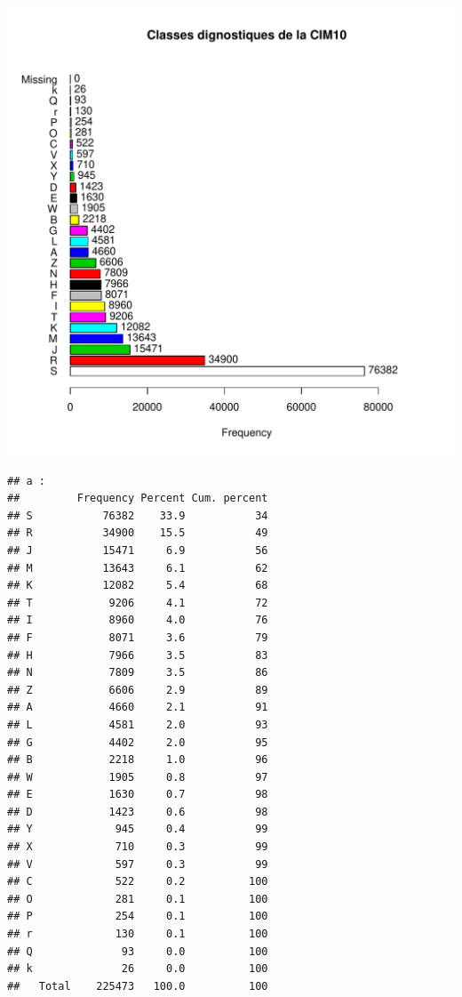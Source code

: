 \documentclass[12pt,english,french,twoside]{book}\usepackage[]{graphicx}\usepackage[]{color}
\makeatletter
\def\maxwidth{ %
  \ifdim\Gin@nat@width>\linewidth
    \linewidth
  \else
    \Gin@nat@width
  \fi
}
\newenvironment{kframe}{%
 \def\at@end@of@kframe{}%
 \ifinner\ifhmode%
  \def\at@end@of@kframe{\end{minipage}}%
  \begin{minipage}{\columnwidth}%
 \fi\fi%
 \def\FrameCommand##1{\hskip\@totalleftmargin \hskip-\fboxsep
 \colorbox{shadecolor}{##1}\hskip-\fboxsep
     \hskip-\linewidth \hskip-\@totalleftmargin \hskip\columnwidth}%
 \MakeFramed {\advance\hsize-\width
   \@totalleftmargin\z@ \linewidth\hsize
   \@setminipage}}%
 {\par\unskip\endMakeFramed%
 \at@end@of@kframe}
\newenvironment{knitrout}{}{} %
\makeatother
\begin{document}
\begin{knitrout}
\color{fgcolor}
\includegraphics[width=\maxwidth]{figure/class_cim10} 
\begin{kframe}\begin{verbatim}
## a :  
##         Frequency Percent Cum. percent
## S           76382    33.9           34
## R           34900    15.5           49
## J           15471     6.9           56
## M           13643     6.1           62
## K           12082     5.4           68
## T            9206     4.1           72
## I            8960     4.0           76
## F            8071     3.6           79
## H            7966     3.5           83
## N            7809     3.5           86
## Z            6606     2.9           89
## A            4660     2.1           91
## L            4581     2.0           93
## G            4402     2.0           95
## B            2218     1.0           96
## W            1905     0.8           97
## E            1630     0.7           98
## D            1423     0.6           98
## Y             945     0.4           99
## X             710     0.3           99
## V             597     0.3           99
## C             522     0.2          100
## O             281     0.1          100
## P             254     0.1          100
## r             130     0.1          100
## Q              93     0.0          100
## k              26     0.0          100
##   Total    225473   100.0          100
\end{verbatim}
\end{kframe}
\end{knitrout}
\end{document}
